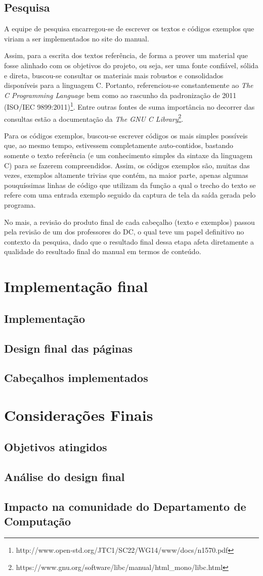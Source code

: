 \documentclass{article}
\begin{document}
\subsection{Pesquisa}
A equipe de pesquisa encarregou-se de escrever os textos e códigos exemplos que viriam a ser implementados no site do manual.

Assim, para a escrita dos textos referência, de forma a prover um material que fosse alinhado com os objetivos do projeto, ou seja, ser uma fonte confiável, sólida e direta, buscou-se consultar os materiais mais robustos e consolidados disponíveis para a linguagem C. Portanto, referenciou-se constantemente ao \textit{The C Programming Language} bem como ao rascunho da padronização de 2011 (ISO/IEC 9899:2011)\footnote{http://www.open-std.org/JTC1/SC22/WG14/www/docs/n1570.pdf}. Entre outras fontes de suma importância no decorrer das consultas estão a documentação da \textit{The GNU C Library}\footnote{https://www.gnu.org/software/libc/manual/html\_mono/libc.html}.

Para os códigos exemplos, buscou-se escrever códigos os mais simples possíveis que, ao mesmo tempo, estivessem completamente auto-contidos, bastando somente o texto referência (e um conhecimento simples da sintaxe da linguagem C) para se fazerem compreendidos. Assim, os códigos exemplos são, muitas das vezes, exemplos altamente trivias que contém, na maior parte, apenas algumas pouquíssimas linhas de código que utilizam da função a qual o trecho do texto se refere com uma entrada exemplo seguido da captura de tela da saída gerada pelo programa.

No mais, a revisão do produto final de cada cabeçalho (texto e exemplos) passou pela revisão de um dos professores do \ac{DC}, o qual teve um papel definitivo no contexto da pesquisa, dado que o resultado final dessa etapa afeta diretamente a qualidade do resultado final do manual em termos de conteúdo.

\section{Implementação final}
\subsection{Implementação}
\subsection{Design final das páginas}
\subsection{Cabeçalhos implementados}

\section{Considerações Finais}
\subsection{Objetivos atingidos}
\subsection{Análise do design final}
\subsection{Impacto na comunidade do Departamento de Computação}
\end{document}
